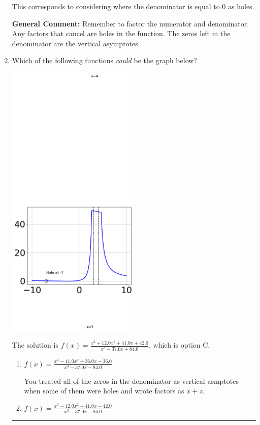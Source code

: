 \documentclass{extbook}[14pt]
\newcommand{\litem}[1]{\item #1

\rule{\textwidth}{0.4pt}}
\begin{document}
\begin{enumerate}
{\begin{enumerate}[label=\Alph*.]
This corresponds to considering where the denominator is equal to 0 as holes.
\end{enumerate}

\textbf{General Comment:} Remember to factor the numerator and denominator. Any factors that cancel are holes in the function. The zeros left in the denominator are the vertical asymptotes.
}
\litem{
Which of the following functions \textit{could} be the graph below?

\begin{center}
    \includegraphics[width=0.5\textwidth]{../Figures/identifyGraphOfRationalFunctionCopyC.png}
\end{center}


The solution is \( f(x)=\frac{x^{3} +12.0 x^{2} +41.0 x + 42.0}{x^{3} -37.0 x + 84.0} \), which is option C.\begin{enumerate}[label=\Alph*.]
\item \( f(x)=\frac{x^{3} -11.0 x^{2} +36.0 x -36.0}{x^{3} -37.0 x -84.0} \)

You treated all of the zeros in the denominator as vertical asmptotes when some of them were holes and wrote factors as $x+z$.
\item \( f(x)=\frac{x^{3} -12.0 x^{2} +41.0 x -42.0}{x^{3} -37.0 x -84.0} \)


\end{enumerate}}
\end{enumerate}
\end{document}
